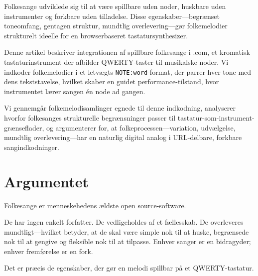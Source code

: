 \documentclass[11pt]{article}
\begin{document}
\clearpage
\begin{accentcard}

Folkesange udviklede sig til at være spillbare uden noder, huskbare uden instrumenter og forkbare uden tilladelse. Disse egenskaber---begrænset toneomfang, gentagen struktur, mundtlig overlevering---gør folkemelodier strukturelt ideelle for en browserbaseret tastatursynthesizer.

\vspace{0.3em}

Denne artikel beskriver integrationen af spillbare folkesange i \np{}.com, et kromatisk tastaturinstrument der afbilder QWERTY-taster til musikalske noder. Vi indkoder folkemelodier i et letvægts \texttt{NOTE:word}-format, der parrer hver tone med dens tekststavelse, hvilket skaber en guidet performance-tilstand, hvor instrumentet lærer sangen én node ad gangen.

\vspace{0.3em}

Vi gennemgår folkemelodisamlinger egnede til denne indkodning, analyserer hvorfor folkesanges strukturelle begrænsninger passer til tastatur-som-instrument-grænseflader, og argumenterer for, at folkeprocessen---variation, udvælgelse, mundtlig overlevering---har en naturlig digital analog i URL-delbare, forkbare sangindkodninger.
\end{accentcard}

\section{Argumentet}

Folkesange er menneskehedens ældste open source-software.

De har ingen enkelt forfatter. De vedligeholdes af et fællesskab. De overleveres mundtligt---hvilket betyder, at de skal være simple nok til at huske, begrænsede nok til at gengive og fleksible nok til at tilpasse. Enhver sanger er en bidragyder; enhver fremførelse er en fork.

\vspace{0.3em}

Det er præcis de egenskaber, der gør en melodi spillbar på et QWERTY-tastatur.
\end{document}
